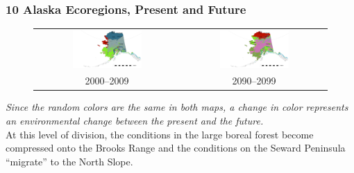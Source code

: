 \begin{frame}
 \frametitle{10 Alaska Ecoregions, Present and Future}
 \vskip-0.15in
 \setlength{\tabcolsep}{0pt}
 \begin{figure}
   \begin{tabular}{cc}
   \includegraphics[width=0.50\textwidth]{ngee_figures/alaska_dem_Feb2012_10_2000-2009_barscale} &
   \includegraphics[width=0.50\textwidth]{ngee_figures/alaska_dem_Feb2012_10_2090-2099_barscale} \\
   2000--2009 & 2090--2099 \\
   \end{tabular}
  \vbox{\scriptsize\hfill\citep{Hoffman_LandscapeEcol_20131001}}
  \label{fig:alaska_both_10}
 \end{figure}
 \vskip-0.15in
\emph{Since the random colors are the same in both maps, a change in color
represents an environmental change between the present and the future.}\\

At this level of division, the conditions in the large boreal forest
become compressed onto the Brooks Range and the conditions on
the Seward Peninsula ``migrate'' to the North Slope.

\end{frame}

